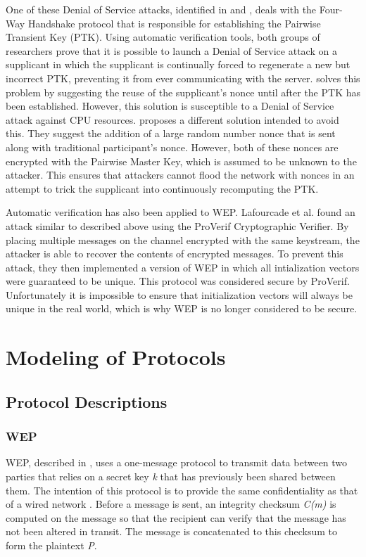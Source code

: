 \documentclass[11pt, twocolumn]{article} %
\begin{document}
One of these Denial of Service attacks, identified in \cite{he04} and \cite{liu08}, deals with the Four-Way Handshake protocol that is responsible for establishing the Pairwise Transient Key (PTK).  Using automatic verification tools, both groups of researchers prove that it is possible to launch a Denial of Service attack on a supplicant in which the supplicant is continually forced to regenerate a new but incorrect PTK, preventing it from ever communicating with the server.  \cite{he04} solves this problem by suggesting the reuse of the supplicant's nonce until after the PTK has been established.  However, this solution is susceptible to a Denial of Service attack against CPU resources.  \cite{liu08} proposes a different solution intended to avoid this.  They suggest the addition of a large random number nonce that is sent along with traditional participant's nonce.  However, both of these nonces are encrypted with the Pairwise Master Key, which is assumed to be unknown to the attacker.  This ensures that attackers cannot flood the network with nonces in an attempt to trick the supplicant into continuously recomputing the PTK.

Automatic verification has also been applied to WEP.  Lafourcade et al. found an attack similar to \cite{borisov01} described above using the ProVerif Cryptographic Verifier. By placing multiple messages on the channel encrypted with the same keystream, the attacker is able to recover the contents of encrypted messages.  To prevent this attack, they then implemented a version of WEP in which all intialization vectors were guaranteed to be unique.  This protocol was considered secure by ProVerif.  Unfortunately it is impossible to ensure that initialization vectors will always be unique in the real world, which is why WEP is no longer considered to be secure.
 
\section{Modeling of Protocols}
\label{sec:model}
\subsection{Protocol Descriptions}
\subsubsection{WEP}
WEP, described in \cite{borisov01}, uses a one-message protocol to transmit data between two parties that relies on a secret key \textit{k} that has previously been shared between them.  The intention of this protocol is to provide the same confidentiality as that of a wired network \cite{IEEE802.11}.  Before a message is sent, an integrity checksum \textit{C(m)} is computed on the message so that the recipient can verify that the message has not been altered in transit.  The message is concatenated to this checksum to form the plaintext \textit{P}.
\end{document}
